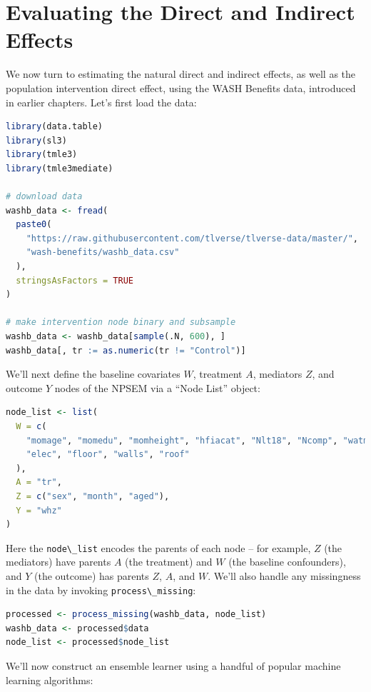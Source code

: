 \documentclass[
  12pt, krantz2,
]{krantz}
\newcommand{\passthrough}[1]{#1}
\newcommand{\1}{\mathbbm{1}}
\theoremstyle{definition}
\theoremstyle{definition}
\theoremstyle{definition}
\theoremstyle{definition}
\theoremstyle{remark}
\begin{document}
\hypertarget{evaluating-the-direct-and-indirect-effects}{%
\section{Evaluating the Direct and Indirect Effects}\label{evaluating-the-direct-and-indirect-effects}}

We now turn to estimating the natural direct and indirect effects, as well as
the population intervention direct effect, using the WASH Benefits data,
introduced in earlier chapters. Let's first load the data:

\begin{lstlisting}[language=R]
library(data.table)
library(sl3)
library(tmle3)
library(tmle3mediate)

# download data
washb_data <- fread(
  paste0(
    "https://raw.githubusercontent.com/tlverse/tlverse-data/master/",
    "wash-benefits/washb_data.csv"
  ),
  stringsAsFactors = TRUE
)

# make intervention node binary and subsample
washb_data <- washb_data[sample(.N, 600), ]
washb_data[, tr := as.numeric(tr != "Control")]
\end{lstlisting}

We'll next define the baseline covariates \(W\), treatment \(A\), mediators \(Z\),
and outcome \(Y\) nodes of the NPSEM via a ``Node List'' object:

\begin{lstlisting}[language=R]
node_list <- list(
  W = c(
    "momage", "momedu", "momheight", "hfiacat", "Nlt18", "Ncomp", "watmin",
    "elec", "floor", "walls", "roof"
  ),
  A = "tr",
  Z = c("sex", "month", "aged"),
  Y = "whz"
)
\end{lstlisting}

Here the \passthrough{\lstinline!node\_list!} encodes the parents of each node -- for example, \(Z\) (the
mediators) have parents \(A\) (the treatment) and \(W\) (the baseline confounders),
and \(Y\) (the outcome) has parents \(Z\), \(A\), and \(W\). We'll also handle any
missingness in the data by invoking \passthrough{\lstinline!process\_missing!}:

\begin{lstlisting}[language=R]
processed <- process_missing(washb_data, node_list)
washb_data <- processed$data
node_list <- processed$node_list
\end{lstlisting}

We'll now construct an ensemble learner using a handful of popular machine
learning algorithms:
\end{document}
